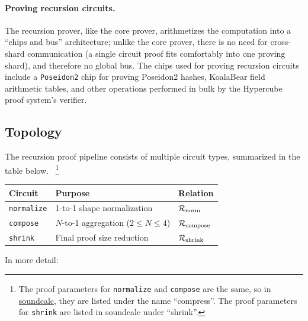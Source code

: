 \documentclass[11pt]{article}
\begin{document}
\paragraph{Proving recursion circuits.}  The recursion prover, like the core prover, arithmetizes
the computation into a ``chips and bus'' architecture; unlike the core prover, there is no need for
cross-shard communication (a single circuit proof fits comfortably into one proving shard), and therefore
no global bus. The chips used for proving recursion circuits include a \texttt{Poseidon2} chip for proving
Poseidon2 hashes, KoalaBear field arithmetic tables, and other operations performed in bulk by the Hypercube
proof system's verifier.


\subsection{Topology}

The recursion proof pipeline consists of multiple circuit types, summarized in the table below.
~\footnote{The proof parameters for \texttt{normalize} and \texttt{compose} are the same, so in \href{https://github.com/ethereum/soundcalc/blob/main/soundcalc/zkvms/sp1/sp1.toml}{soundcalc}, they are listed under the name ``compress''.
The proof parameters for \texttt{shrink} are listed in soundcalc under ``shrink''.
}

\begin{center}
\begin{tabular}{lll}
\hline
\textbf{Circuit} & \textbf{Purpose} & \textbf{Relation}\\
\hline
\texttt{normalize}          & 1-to-1 shape normalization & $\mathcal{R}_{\mathrm{norm}}$ \\
\texttt{compose}            & $N$-to-1 aggregation ($2\!\leq\! N\!\leq\! 4$) & $\mathcal{R}_{\mathrm{compose}}$ \\
\texttt{shrink}             & Final proof size reduction & $\mathcal{R}_{\mathrm{shrink}}$ \\
\hline
\end{tabular}
\end{center}

In more detail:
\end{document}

